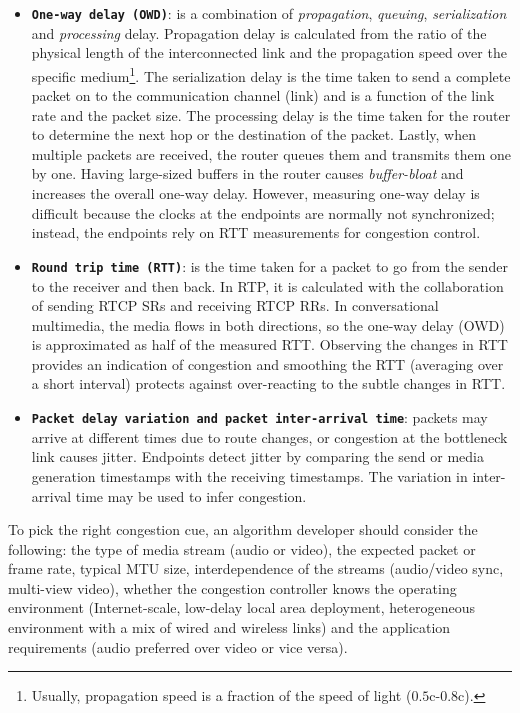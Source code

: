 \begin{itemize}
\item \textbf{\texttt{One-way delay (OWD)}}: is a combination of
\emph{propagation}, \emph{queuing}, \emph{serialization} and \emph{processing}
delay. Propagation delay is calculated from the ratio of the physical length
of the interconnected link and the propagation speed over the specific
medium\footnote{Usually, propagation speed is a fraction of the speed of light
($0.5$c-$0.8$c).}. The serialization delay is the time taken to send a
complete packet on to the communication channel (link) and is a function of
the link rate and the packet size. The processing delay is the time taken for the
router to determine the next hop or the destination of the packet. Lastly,
when multiple packets are received, the router queues them and transmits them
one by one. Having large-sized buffers in the router causes \emph{buffer-bloat}
\cite{gettys:bufferbloat} and increases the overall one-way delay.
However, measuring one-way delay is difficult because the clocks at the
endpoints are normally not synchronized; instead, the endpoints rely on RTT
measurements for congestion control.


\item \textbf{\texttt{Round trip time (RTT)}}: is the time taken for a packet
to go from the sender to the receiver and then back. In RTP, it is calculated
with the collaboration of sending RTCP SRs and receiving RTCP RRs. In
conversational multimedia, the media flows in both directions, so the one-way
delay (OWD) is approximated as half of the measured RTT. Observing the changes
in RTT provides an indication of congestion and smoothing the RTT
(averaging over a short interval) protects against over-reacting to the subtle
changes in RTT.

\item \textbf{\texttt{Packet delay variation and packet inter-arrival time}}:
packets may arrive at different times due to route changes, or congestion at
the bottleneck link causes jitter. Endpoints detect jitter by comparing the
send or media generation timestamps with the receiving timestamps. The
variation in inter-arrival time may be used to infer congestion.


\end{itemize}

To pick the right congestion cue, an algorithm developer should consider the
following: the type of media stream (audio or video), the expected packet or
frame rate, typical MTU size, interdependence of the streams (audio/video
sync, multi-view video), whether the congestion controller knows the operating environment (Internet-scale, 
low-delay local area deployment, heterogeneous environment with a mix
of wired and wireless links) and the application requirements (audio preferred
over video or vice versa).

